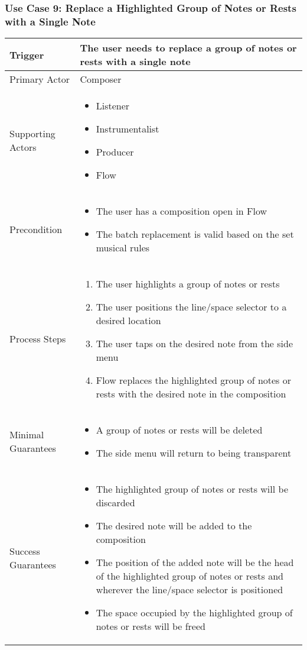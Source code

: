 \subsubsection{Use Case 9: Replace a Highlighted Group of Notes or Rests with a Single Note}

\begin{tabularx}{\textwidth}{|X|X|}
\hline
Trigger & 
The user needs to replace a group of notes or rests with a single note \\
\hline
Primary Actor & 
Composer \\
\hline
Supporting Actors & 
\begin{itemize}
\item Listener
\item Instrumentalist
\item Producer
\item Flow
\end{itemize} \\
\hline
Precondition & 
\begin{itemize}
\item The user has a composition open in Flow
\item The batch replacement is valid based on the set musical rules
\end{itemize} \\
\hline
Process Steps & 
\begin{enumerate}
\item The user highlights a group of notes or rests
\item The user positions the line/space selector to a desired location
\item The user taps on the desired note from the side menu
\item Flow replaces the highlighted group of notes or rests with the desired note in the composition
\end{enumerate} \\
\hline
Minimal Guarantees & 
\begin{itemize}
  \item A group of notes or rests will be deleted
  \item The side menu will return to being transparent
\end{itemize} \\
\hline
Success Guarantees & 
\begin{itemize}
  \item The highlighted group of notes or rests will be discarded
  \item The desired note will be added to the composition
  \item The position of the added note will be the head of the highlighted group of notes or rests and wherever the line/space selector is positioned 
  \item The space occupied by the highlighted group of notes or rests will be freed
\end{itemize} \\
\hline
\end{tabularx}

